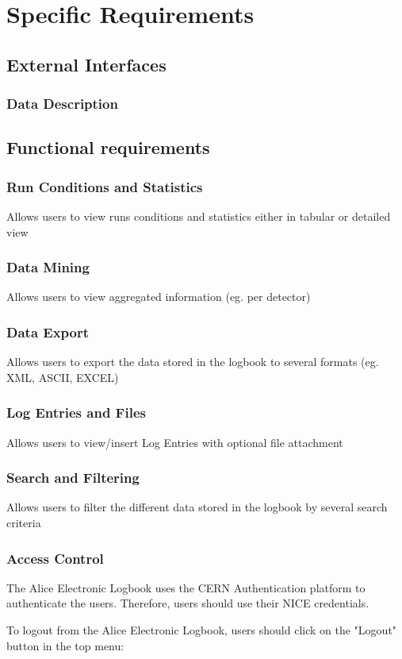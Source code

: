 
\chapter{Specific Requirements}
\section{External Interfaces}
\subsection{Data Description}
\section{Functional requirements}
\subsection{Run Conditions and Statistics}
Allows users to view runs conditions and statistics either in tabular or detailed view
\subsection{Data Mining}
Allows users to view aggregated information (eg. per detector)
\subsection{Data Export}
Allows users to export the data stored in the logbook to several formats (eg. XML, ASCII, EXCEL)
\subsection{Log Entries and Files}
Allows users to view/insert Log Entries with optional file attachment
\subsection{Search and Filtering}
Allows users to filter the different data stored in the logbook by several search criteria
\subsection{Access Control}
The Alice Electronic Logbook uses the CERN Authentication platform to authenticate the users. Therefore, users should use their NICE credentials.

To logout from the Alice Electronic Logbook, users should click on the "Logout" button in the top menu:




